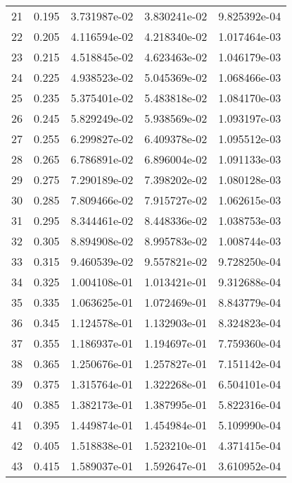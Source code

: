 \begin{table}[ht]
\begin{tabular}{rcccc}
    21 &  0.195 &    3.731987e-02 &    3.830241e-02  &     9.825392e-04\\ 
    22 &  0.205 &    4.116594e-02 &    4.218340e-02  &     1.017464e-03\\ 
    23 &  0.215 &    4.518845e-02 &    4.623463e-02  &     1.046179e-03\\ 
    24 &  0.225 &    4.938523e-02 &    5.045369e-02  &     1.068466e-03\\ 
    25 &  0.235 &    5.375401e-02 &    5.483818e-02  &     1.084170e-03\\ 
    26 &  0.245 &    5.829249e-02 &    5.938569e-02  &     1.093197e-03\\ 
    27 &  0.255 &    6.299827e-02 &    6.409378e-02  &     1.095512e-03\\ 
    28 &  0.265 &    6.786891e-02 &    6.896004e-02  &     1.091133e-03\\ 
    29 &  0.275 &    7.290189e-02 &    7.398202e-02  &     1.080128e-03\\ 
    30 &  0.285 &    7.809466e-02 &    7.915727e-02  &     1.062615e-03\\ 
    31 &  0.295 &    8.344461e-02 &    8.448336e-02  &     1.038753e-03\\ 
    32 &  0.305 &    8.894908e-02 &    8.995783e-02  &     1.008744e-03\\ 
    33 &  0.315 &    9.460539e-02 &    9.557821e-02  &     9.728250e-04\\ 
    34 &  0.325 &    1.004108e-01 &    1.013421e-01  &     9.312688e-04\\ 
    35 &  0.335 &    1.063625e-01 &    1.072469e-01  &     8.843779e-04\\ 
    36 &  0.345 &    1.124578e-01 &    1.132903e-01  &     8.324823e-04\\ 
    37 &  0.355 &    1.186937e-01 &    1.194697e-01  &     7.759360e-04\\ 
    38 &  0.365 &    1.250676e-01 &    1.257827e-01  &     7.151142e-04\\ 
    39 &  0.375 &    1.315764e-01 &    1.322268e-01  &     6.504101e-04\\ 
    40 &  0.385 &    1.382173e-01 &    1.387995e-01  &     5.822316e-04\\ 
    41 &  0.395 &    1.449874e-01 &    1.454984e-01  &     5.109990e-04\\ 
    42 &  0.405 &    1.518838e-01 &    1.523210e-01  &     4.371415e-04\\ 
    43 &  0.415 &    1.589037e-01 &    1.592647e-01  &     3.610952e-04\\ 

\end{tabular}
\end{table}
